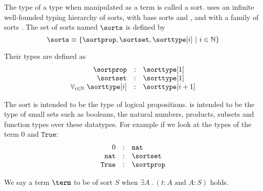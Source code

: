 \begin{definition}[sort]\label{def:sort}
	The type of a type when manipulated as a term is called a sort.
	\pcic uses an infinite well-founded typing hierarchy of sorts,
	with base sorts \sortprop{} and \sortset{},
	and with a family of sorts \sorttype[{i}].
	The set of sorts named $\sorts$ is defined by
	\[\sorts \equiv \{ \sortprop, \sortset, \sorttype[{i}] ~|~ i \in \mathbb{N} \} \]

	Their types are defined as
	\[
		\begin{array}{rcl}
			\sortprop & : & \sorttype[1] \\
			\sortset & : & \sorttype[1] \\
			\forall_{i \in \mathbb{N}}~ \sorttype[i] & : & \sorttype[{i+1}]
		\end{array}
	\]
\end{definition}

The sort \sortprop is intended to be the type of logical propositions.
\sortset is intended to be the type of small sets such as booleans, the natural numbers, products, subsets and function types over these datatypes.
For example if we look at the types of the term $0$ and $\texttt{True}$:
	\[
		\begin{array}{rcl}
			0 & : & \texttt{nat} \\
			\texttt{nat} & : & \sortset \\
			\texttt{True} & : & \sortprop
		\end{array}
	\]

We say a term $\term$ to be of sort $S$ when $\exists A ~.~ (t : A \text{~and~} A : S)$ holds.

